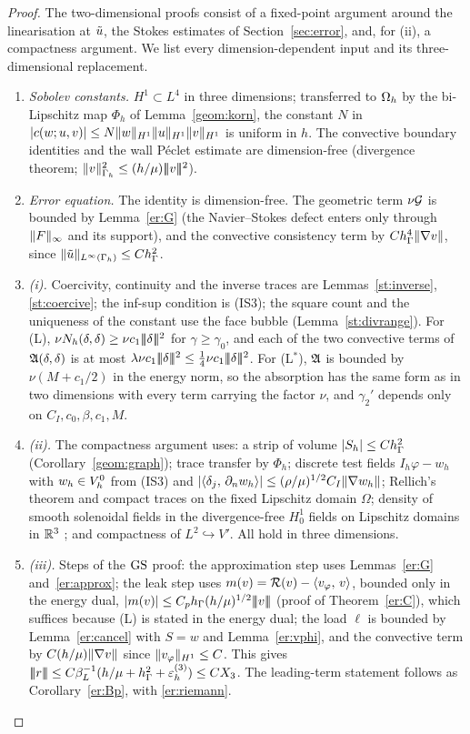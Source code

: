 \begin{proof}
The two-dimensional proofs \cite{PadhiLong2D} consist of a fixed-point argument around the linearisation at $\tilde u$, the Stokes estimates of Section~\ref{sec:error}, and, for (ii), a compactness argument. We list every dimension-dependent input and its three-dimensional replacement.
\begin{enumerate}
\item \emph{Sobolev constants.} $H^1\subset L^4$ in three dimensions; transferred to $\Omega_h$ by the bi-Lipschitz map $\Phi_h$ of Lemma~\ref{geom:korn}, the constant $N$ in $|c(w;u,v)|\le N\lVert w\rVert_{H^1}\lVert u\rVert_{H^1}\lVert v\rVert_{H^1}$ is uniform in $h$. The convective boundary identities and the wall P\'eclet estimate are dimension-free (divergence theorem; $\lVert v\rVert^2_{\Gamma_h}\le(h/\mu)|\!|\!|v|\!|\!|^2$).
\item \emph{Error equation.} The identity is dimension-free. The geometric term $\nu\mathcal G$ is bounded by Lemma~\ref{er:G} (the Navier--Stokes defect enters only through $\lVert F\rVert_\infty$ and its support), and the convective consistency term by $Ch_\Gamma^4\lVert \nabla v\rVert$, since $\lVert \tilde u\rVert_{L^\infty(\Gamma_h)}\le Ch_\Gamma^2$.
\item \emph{(i).} Coercivity, continuity and the inverse traces are Lemmas~\ref{st:inverse}, \ref{st:coercive}; the inf-sup condition is (IS3); the square count and the uniqueness of the constant use the face bubble (Lemma~\ref{st:divrange}). For (L), $\nu N_h(\delta,\delta)\ge\nu c_1|\!|\!|\delta|\!|\!|^2$ for $\gamma\ge\gamma_0$, and each of the two convective terms of $\mathfrak A(\delta,\delta)$ is at most $\lambda\nu c_1\tnorm\delta^2\le\frac14\nu c_1\tnorm\delta^2$. For (L$^\ast$), $\mathfrak A$ is bounded by $\nu(M+c_1/2)$ in the energy norm, so the absorption has the same form as in two dimensions with every term carrying the factor $\nu$, and $\gamma_2'$ depends only on $C_I,c_0,\beta,c_1,M$.
\item \emph{(ii).} The compactness argument uses: a strip of volume $|S_h|\le Ch_\Gamma^2$ (Corollary~\ref{geom:graph}); trace transfer by $\Phi_h$; discrete test fields $I_h\varphi-w_h$ with $w_h\in V_h^0$ from (IS3) and $|\langle \delta_j,\, \partial_n w_h\rangle|\le(\rho/\mu)^{1/2}C_I\lVert \nabla w_h\rVert$; Rellich's theorem and compact traces on the fixed Lipschitz domain $\Omega$; density of smooth solenoidal fields in the divergence-free $H^1_0$ fields on Lipschitz domains in $\mathbb R^3$ \cite{Temam}; and compactness of $L^2\hookrightarrow V'$. All hold in three dimensions.
\item \emph{(iii).} Steps of the $\mathrm{GS}$ proof: the approximation step uses Lemmas~\ref{er:G} and~\ref{er:approx}; the leak step uses $m(v)=\mathcal R(v)-\langle v_\varphi,\, v\rangle$, bounded only in the energy dual, $|m(v)|\le C_ph_\Gamma(h/\mu)^{1/2}|\!|\!|v|\!|\!|$ (proof of Theorem~\ref{er:C}), which suffices because (L) is stated in the energy dual; the load $\ell$ is bounded by Lemma~\ref{er:cancel} with $S=w$ and Lemma~\ref{er:vphi}, and the convective term by $C(h/\mu)\lVert \nabla v\rVert$ since $\lVert v_\varphi\rVert_{H^1}\le C$. This gives $|\!|\!|r|\!|\!|\le C\beta_L^{-1}(h/\mu+h_\Gamma^2+\varepsilon_h^{(3)})\le CX_3$. The leading-term statement follows as Corollary~\ref{er:Bp}, with \eqref{er:riemann}.

\end{enumerate}
\end{proof}
